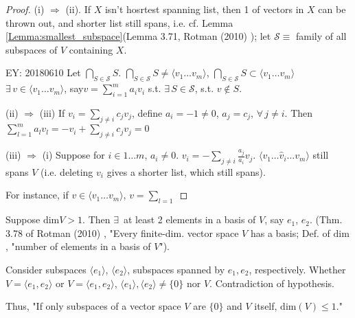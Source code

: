 \documentclass[10pt]{amsart}
\newcommand{\exercisehead}[1]
  { \smallskip
   \noindent{\small\bf Exercise #1.}
  }
\begin{document}
\begin{multicols*}{2}
\begin{proof}
(i) $\Longrightarrow$ (ii). If $X$ isn't hosrtest spanning list, then 1 of vectors in $X$ can be thrown out, and shorter list still spans, i.e. cf. Lemma \ref{Lemma:smallest_subspace}(Lemma 3.71, Rotman (2010) \cite{JRotman2010}); let $\mathcal{S} \equiv $ family of all subspaces of $V$ containing $X$. 

EY: 20180610 
Let $\bigcap_{S\in \mathcal{S}} S$. $\bigcap_{S \in \mathcal{S}} S \neq \langle v_1 \dots v_m \rangle$, $\bigcap_{S \in \mathcal{S}} S \subset \langle v_1 \dots v_m \rangle$ \\
$\exists \, v \in \langle v_1 \dots v_m \rangle$, say$v= \sum_{i=1}^m a_i v_i$ s.t. $\exists \, S \in \mathcal{S}$, s.t. $v\notin S$.  

(ii) $\Longrightarrow$ (iii) If $v_i = \sum_{j\neq i} c_j v_j$, define $a_i  = -1 \neq 0$, $a_j = c_j$, $\forall \, j \neq i$.  Then $\sum_{l=1}^m a_l v_l = -v_i + \sum_{j\neq i } c_j v_j = 0$

(iii) $\Longrightarrow$ (i) Suppose for $i \in 1 \dots m$, $a_i \neq 0$.  $v_i = -\sum_{j\neq i} \frac{a_j}{a_i} v_j$.  $\langle v_1 \dots \widehat{v}_i \dots v_m\rangle$ still spans $V$ (i.e. deleting $v_i$ gives a shorter list, which still spans).  

For instance, if $v\in \langle v_1 \dots v_m \rangle$, $v= \sum_{l=1}$%





	\end{proof}

\exercisehead{3.67} Suppose $\text{dim}V >1$. Then $\exists \, $ at least 2 elements in a basis of $V$, say $e_1$, $e_2$. (Thm. 3.78 of Rotman (2010) \cite{JRotman2010}, "Every finite-dim. vector space $V$ has a basis; Def. of $\text{dim}$, "number of elements in a basis of $V$").   

Consider subspaces $\langle e_1 \rangle$, $\langle e_2 \rangle$, subspaces spanned by $e_1,e_2$, respectively. Whether $V= \langle e_1, e_2 \rangle$ or $V= \langle e_1, e_2\rangle$, $\langle e_1 \rangle , \langle e_2 \rangle \neq \lbrace 0 \rbrace$ nor $V$. Contradiction of hypothesis.  

Thus, "If only subspaces of a vector space $V$ are $\lbrace 0 \rbrace$ and $V$ itself, $\text{dim}(V) \leq 1$."




\end{multicols*}
\end{document}
